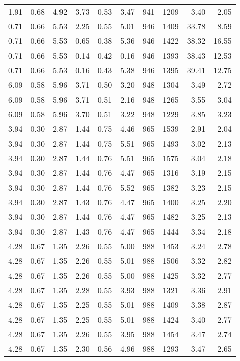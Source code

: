 \begin{longtable}{rrrrrrrrrr}
1.91	&	0.68	&	4.92	&	3.73	&	0.53	&	3.47	&	941	&	1209	&	3.40	&	2.05	\\
0.71	&	0.66	&	5.53	&	2.25	&	0.55	&	5.01	&	946	&	1409	&	33.78	&	8.59	\\
0.71	&	0.66	&	5.53	&	0.65	&	0.38	&	5.36	&	946	&	1422	&	38.32	&	16.55	\\
0.71	&	0.66	&	5.53	&	0.14	&	0.42	&	0.16	&	946	&	1393	&	38.43	&	12.53	\\
0.71	&	0.66	&	5.53	&	0.16	&	0.43	&	5.38	&	946	&	1395	&	39.41	&	12.75	\\
6.09	&	0.58	&	5.96	&	3.71	&	0.50	&	3.20	&	948	&	1304	&	3.49	&	2.72	\\
6.09	&	0.58	&	5.96	&	3.71	&	0.51	&	2.16	&	948	&	1265	&	3.55	&	3.04	\\
6.09	&	0.58	&	5.96	&	3.70	&	0.51	&	3.22	&	948	&	1229	&	3.85	&	3.23	\\
3.94	&	0.30	&	2.87	&	1.44	&	0.75	&	4.46	&	965	&	1539	&	2.91	&	2.04	\\
3.94	&	0.30	&	2.87	&	1.44	&	0.75	&	5.51	&	965	&	1493	&	3.02	&	2.13	\\
3.94	&	0.30	&	2.87	&	1.44	&	0.76	&	5.51	&	965	&	1575	&	3.04	&	2.18	\\
3.94	&	0.30	&	2.87	&	1.44	&	0.76	&	4.47	&	965	&	1316	&	3.19	&	2.15	\\
3.94	&	0.30	&	2.87	&	1.44	&	0.76	&	5.52	&	965	&	1382	&	3.23	&	2.15	\\
3.94	&	0.30	&	2.87	&	1.43	&	0.76	&	4.47	&	965	&	1400	&	3.25	&	2.20	\\
3.94	&	0.30	&	2.87	&	1.44	&	0.76	&	4.47	&	965	&	1482	&	3.25	&	2.13	\\
3.94	&	0.30	&	2.87	&	1.43	&	0.76	&	4.47	&	965	&	1444	&	3.34	&	2.18	\\
4.28	&	0.67	&	1.35	&	2.26	&	0.55	&	5.00	&	988	&	1453	&	3.24	&	2.78	\\
4.28	&	0.67	&	1.35	&	2.26	&	0.55	&	5.01	&	988	&	1506	&	3.32	&	2.82	\\
4.28	&	0.67	&	1.35	&	2.26	&	0.55	&	5.00	&	988	&	1425	&	3.32	&	2.77	\\
4.28	&	0.67	&	1.35	&	2.28	&	0.55	&	3.93	&	988	&	1321	&	3.36	&	2.91	\\
4.28	&	0.67	&	1.35	&	2.25	&	0.55	&	5.01	&	988	&	1409	&	3.38	&	2.87	\\
4.28	&	0.67	&	1.35	&	2.25	&	0.55	&	5.01	&	988	&	1424	&	3.40	&	2.77	\\
4.28	&	0.67	&	1.35	&	2.26	&	0.55	&	3.95	&	988	&	1454	&	3.47	&	2.74	\\
4.28	&	0.67	&	1.35	&	2.30	&	0.56	&	4.96	&	988	&	1293	&	3.47	&	2.65	\\

\end{longtable}
